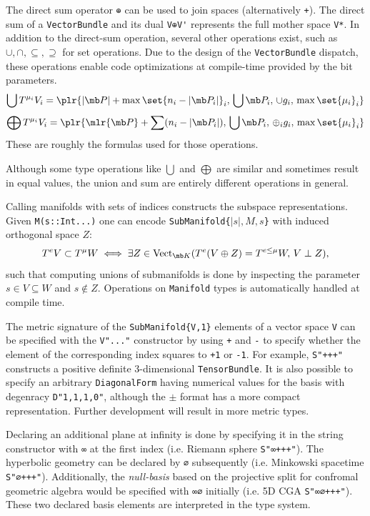 \documentclass{juliacon}
\begin{document}
The direct sum operator \verb`⊕` can be used to join spaces (alternatively \verb`+`).
The direct sum of a \verb`VectorBundle` and its dual \verb`V⊕V'` represents the full mother space \verb`V*`.
In addition to the direct-sum operation, several other operations exist, such as $\cup,\cap,\subseteq,\supseteq$ for set operations.
Due to the design of the \verb`VectorBundle` dispatch, these operations enable code optimizations at compile-time provided by the bit parameters.
$$ \bigcup T^{\mu_i}V_i = \plr{|\mb P|+\max\set{n_i-|\mb P_i|}_i,\, \bigcup \mb P_i,\, \cup g_i,\, \max\set{\mu_i}_i} $$
$$ \bigoplus T^{\mu_i}V_i = \plr{\mlr{\mb P}+\sum (n_i-|\mb P_i|),\, \bigcup \mb P_i,\, \oplus_i g_i,\,\max\set{\mu_i}_i} $$
These are roughly the formulas used for those operations.
\begin{remark}
	Although some type operations like $\bigcup$ and $\bigoplus$ are similar and sometimes result in equal values, the union and sum are entirely different operations in general.
\end{remark}

Calling manifolds with sets of indices constructs the subspace representations.
Given \verb`M(s::Int...)` one can encode \verb+SubManifold{+$|s|,M,s$\verb+}+ with induced orthogonal space $Z$:
$$T^eV \subset T^\mu W \iff \exists Z\in\text{Vect}_{\mb K}(T^e(V\oplus Z) = T^{e\leq \mu}W,\,V\perp Z),$$
such that computing unions of submanifolds is done by inspecting the parameter $s\in V\subseteq W$ and $s\notin Z$. Operations on \verb`Manifold` types is automatically handled at compile time.

The metric signature of the \verb+SubManifold{V,1}+ elements of a vector space \verb+V+ can be specified with the \verb+V"..."+ constructor by using \verb-+- and \verb+-+ to specify whether the element of the corresponding index squares to \verb`+1` or \verb`-1`.
For example, \verb`S"+++"` constructs a positive definite 3-dimensional \verb`TensorBundle`.
It is also possible to specify an arbitrary \verb`DiagonalForm` having numerical values for the basis with degenracy \verb`D"1,1,1,0"`, although the $\pm$ format has a more compact representation.
Further development will result in more metric types.

Declaring an additional plane at infinity is done by specifying it in the string constructor with \verb`∞` at the first index (i.e. Riemann sphere \verb`S"∞+++"`). The hyperbolic geometry can be declared by \verb`∅` subsequently (i.e. Minkowski spacetime \verb`S"∅+++"`). 
Additionally, the \textit{null-basis} based on the projective split for confromal geometric algebra would be specified with \verb`∞∅` initially (i.e. 5D CGA \verb`S"∞∅+++"`). These two declared basis elements are interpreted in the type system. %
\end{document}
